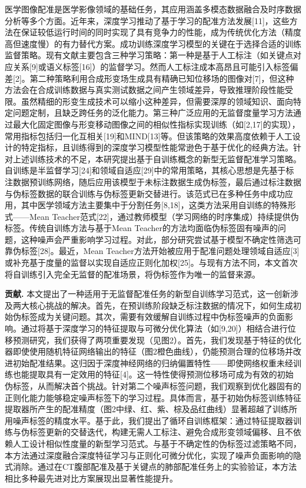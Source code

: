 医学图像配准是医学影像领域的基础任务，其应用涵盖多模态数据融合及时序数据分析等多个方面。近年来，深度学习推动了基于学习的配准方法发展[11]，这些方法在保证较低运行时间的同时实现了具有竞争力的性能，成为传统优化方法（精度高但速度慢）的有力替代方案。成功训练深度学习模型的关键在于选择合适的训练监督策略。现有文献主要包含三种学习策略：第一种是基于人工标注（如关键点对应关系[9]或语义标签[16]）的监督学习。然而人工标注成本高昂且可能引入标签偏差[2]。第二种策略利用合成形变场生成具有精确已知位移场的图像对[7]，但这种方法会在合成训练数据与真实测试数据之间产生领域差异，导致推理阶段性能受限。虽然精细的形变生成技术可以缩小这种差异，但需要深厚的领域知识、面向特定问题定制，且缺乏跨任务的泛化能力。第三种广泛应用的无监督度量学习方法通过最大化固定图像与形变移动图像之间的相似性指标实现训练（如[2,17]的实现），常用指标包括归一化互相关[19]和MIND[13]等。但该策略的效果高度依赖于人工设计的特定指标，且训练得到的深度学习模型性能常逊色于基于优化的经典方法。针对上述训练技术的不足，本研究提出基于自训练概念的新型无监督配准学习策略。自训练是半监督学习[24]和领域自适应[29]中的常用策略，其核心思想是先基于标注数据预训练网络，随后应用该模型于未标注数据生成伪标签，最后通过标注数据与伪标签数据的联合训练与伪标签更新交替进行。该范式已在多种任务中成功应用，其中医学领域方法主要集中于分割任务[8,18]，这类方法采用自训练的特殊形式——Mean Teacher范式[22]，通过教师模型（学习网络的时序集成）持续提供伪标签。传统自训练方法与基于Mean Teacher的方法均面临伪标签固有噪声的问题，这种噪声会严重影响学习过程。对此，部分研究尝试基于模型不确定性筛选可靠伪标签[28]。最近，Mean Teacher方法开始被应用于配准问题处理领域自适应[3]或补充基于度量的监督以实现自适应正则化加权[25]。与现有方法不同，本文首次将自训练引入完全无监督的配准场景，将伪标签作为唯一的监督来源。

\textbf{贡献.}
本文提出了一种适用于无监督配准任务的新型自训练学习范式，这一创新涉及两大核心挑战的解决。首先，在预训练阶段缺乏标注数据的情况下，如何生成初始伪标签成为关键问题。其次，需要有效缓解自训练过程中伪标签噪声的负面影响。通过将基于深度学习的特征提取与可微分优化算法（如[9,20]）相结合进行位移预测研究，我们获得了两项重要发现（见图2）。首先，我们发现基于特征的优化器即使使用随机特征网络输出的特征（图2橙色曲线），仍能预测合理的位移场并改进初始配准结果。这归因于深度神经网络的归纳偏置特性——即使网络权重未经训练也能提取具有一定效用的特征[4]。这一特性使得预测位移场可成为有效的初始伪标签，从而解决首个挑战。针对第二个噪声标签问题，我们观察到优化器固有的正则化能力能够稳定噪声标签下的学习过程。具体而言，基于初始伪标签训练特征提取器所产生的配准精度（图2中绿、红、紫、棕及品红曲线）显著超越了训练所用噪声标签的精度水平。基于此，我们提出了循环自训练框架：通过特征提取器训练与伪标签更新的交替迭代，构建无需人工标注、避免合成形变领域偏移、且不依赖人工设计相似性度量的新型学习范式。与基于不确定性的伪标签过滤策略不同，本方法通过深度融合深度特征学习与正则化可微分优化，实现了噪声负面影响的隐式消除。通过在CT腹部配准及基于关键点的肺部配准任务上的实验验证，本方法相比多种最先进对比方案展现出显著性能提升。

